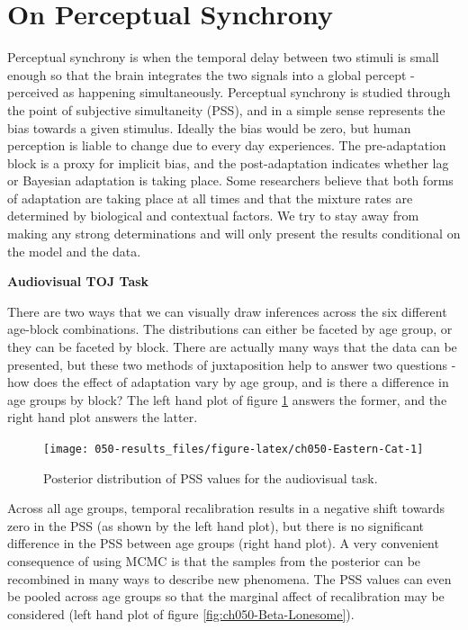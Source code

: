 \documentclass[11pt, oneside, openany]{scrbook}
\begin{document}
\hypertarget{on-perceptual-synchrony}{%
\section{On Perceptual Synchrony}\label{on-perceptual-synchrony}}

Perceptual synchrony is when the temporal delay between two stimuli is small enough so that the brain integrates the two signals into a global percept - perceived as happening simultaneously. Perceptual synchrony is studied through the point of subjective simultaneity (PSS), and in a simple sense represents the bias towards a given stimulus. Ideally the bias would be zero, but human perception is liable to change due to every day experiences. The pre-adaptation block is a proxy for implicit bias, and the post-adaptation indicates whether lag or Bayesian adaptation is taking place. Some researchers believe that both forms of adaptation are taking place at all times and that the mixture rates are determined by biological and contextual factors. We try to stay away from making any strong determinations and will only present the results conditional on the model and the data.

\textbf{Audiovisual TOJ Task}

There are two ways that we can visually draw inferences across the six different age-block combinations. The distributions can either be faceted by age group, or they can be faceted by block. There are actually many ways that the data can be presented, but these two methods of juxtaposition help to answer two questions - how does the effect of adaptation vary by age group, and is there a difference in age groups by block? The left hand plot of figure \ref{fig:ch050-Eastern-Cat} answers the former, and the right hand plot answers the latter.

\begin{figure}

{\centering \texttt{[image: 050-results\_files/figure-latex/ch050-Eastern-Cat-1]} 

}

\caption{Posterior distribution of PSS values for the audiovisual task.}\label{fig:ch050-Eastern-Cat}
\end{figure}

Across all age groups, temporal recalibration results in a negative shift towards zero in the PSS (as shown by the left hand plot), but there is no significant difference in the PSS between age groups (right hand plot). A very convenient consequence of using MCMC is that the samples from the posterior can be recombined in many ways to describe new phenomena. The PSS values can even be pooled across age groups so that the marginal affect of recalibration may be considered (left hand plot of figure \ref{fig:ch050-Beta-Lonesome}).
\end{document}
